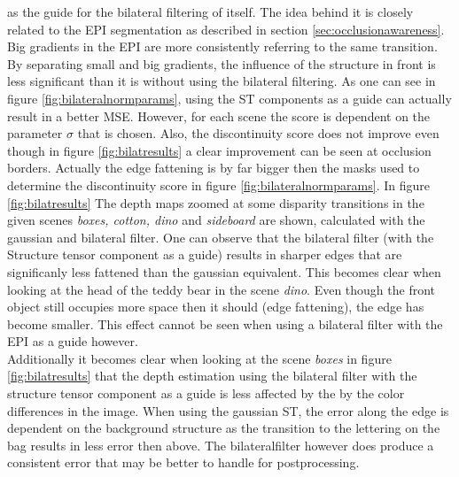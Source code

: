 \documentclass  [
  paper    = a4,
  BCOR     = 10mm,
  twoside,
  fontsize = 12pt,
  fleqn,
  toc      = bibnumbered,
  toc      = listofnumbered,
  numbers  = noendperiod,
  headings = normal,
  listof   = leveldown,
  version  = 3.03
]                                       {scrreprt}
\begin{document}
 as the guide for the bilateral filtering of itself. The idea behind it is closely related to the EPI segmentation as described in section \ref{sec:occlusionawareness}. Big gradients in the EPI are more consistently referring to the same transition. By separating small and big gradients, the influence of the structure in front is less significant than it is without using the bilateral filtering. As one can see in figure \ref{fig:bilateralnormparams}, using the ST components as a guide can actually result in a better MSE. However, for each scene the score is dependent on the parameter $\sigma$ that is chosen. Also, the discontinuity score does not improve even though in figure \ref{fig:bilatresults} a clear improvement can be seen at occlusion borders. Actually the edge fattening is by far bigger then the masks used to determine the discontinuity score in figure \ref{fig:bilateralnormparams}. In figure \ref{fig:bilatresults} The depth maps zoomed at some disparity transitions in the given scenes \textit{boxes, cotton, dino} and \textit{sideboard} are shown, calculated with the gaussian and bilateral filter. One can observe that the bilateral filter (with the Structure tensor component as a guide) results in sharper edges that are significanly less \glqq fattened \grqq than the gaussian equivalent. This becomes clear when looking at the head of the teddy bear in the scene \textit{dino}. Even though the front object still occupies more space then it should (edge fattening), the edge has become smaller. This effect cannot be seen when using a bilateral filter with the EPI as a guide however.\\
 Additionally it becomes clear when looking at the scene \textit{boxes} in figure \ref{fig:bilatresults} that the depth estimation using the bilateral filter with the structure tensor component as a guide is less affected by the by the color differences in the image. When using the gaussian ST, the error along the edge is dependent on the background structure as the transition to the lettering on the bag results in less error then above. The bilateralfilter however does produce a consistent error that may be better to handle for postprocessing.
\end{document}
